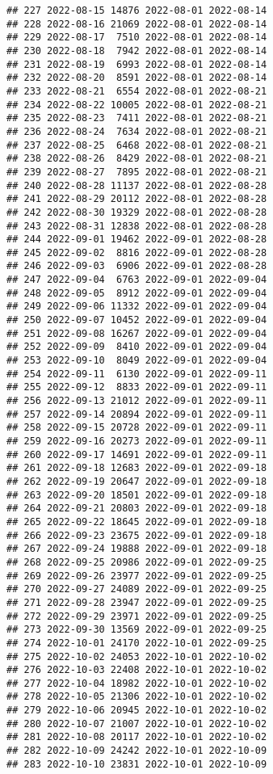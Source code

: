 \documentclass[
]{article}
\begin{document}
\begin{verbatim}
## 227 2022-08-15 14876 2022-08-01 2022-08-14
## 228 2022-08-16 21069 2022-08-01 2022-08-14
## 229 2022-08-17  7510 2022-08-01 2022-08-14
## 230 2022-08-18  7942 2022-08-01 2022-08-14
## 231 2022-08-19  6993 2022-08-01 2022-08-14
## 232 2022-08-20  8591 2022-08-01 2022-08-14
## 233 2022-08-21  6554 2022-08-01 2022-08-21
## 234 2022-08-22 10005 2022-08-01 2022-08-21
## 235 2022-08-23  7411 2022-08-01 2022-08-21
## 236 2022-08-24  7634 2022-08-01 2022-08-21
## 237 2022-08-25  6468 2022-08-01 2022-08-21
## 238 2022-08-26  8429 2022-08-01 2022-08-21
## 239 2022-08-27  7895 2022-08-01 2022-08-21
## 240 2022-08-28 11137 2022-08-01 2022-08-28
## 241 2022-08-29 20112 2022-08-01 2022-08-28
## 242 2022-08-30 19329 2022-08-01 2022-08-28
## 243 2022-08-31 12838 2022-08-01 2022-08-28
## 244 2022-09-01 19462 2022-09-01 2022-08-28
## 245 2022-09-02  8816 2022-09-01 2022-08-28
## 246 2022-09-03  6906 2022-09-01 2022-08-28
## 247 2022-09-04  6763 2022-09-01 2022-09-04
## 248 2022-09-05  8912 2022-09-01 2022-09-04
## 249 2022-09-06 11332 2022-09-01 2022-09-04
## 250 2022-09-07 10452 2022-09-01 2022-09-04
## 251 2022-09-08 16267 2022-09-01 2022-09-04
## 252 2022-09-09  8410 2022-09-01 2022-09-04
## 253 2022-09-10  8049 2022-09-01 2022-09-04
## 254 2022-09-11  6130 2022-09-01 2022-09-11
## 255 2022-09-12  8833 2022-09-01 2022-09-11
## 256 2022-09-13 21012 2022-09-01 2022-09-11
## 257 2022-09-14 20894 2022-09-01 2022-09-11
## 258 2022-09-15 20728 2022-09-01 2022-09-11
## 259 2022-09-16 20273 2022-09-01 2022-09-11
## 260 2022-09-17 14691 2022-09-01 2022-09-11
## 261 2022-09-18 12683 2022-09-01 2022-09-18
## 262 2022-09-19 20647 2022-09-01 2022-09-18
## 263 2022-09-20 18501 2022-09-01 2022-09-18
## 264 2022-09-21 20803 2022-09-01 2022-09-18
## 265 2022-09-22 18645 2022-09-01 2022-09-18
## 266 2022-09-23 23675 2022-09-01 2022-09-18
## 267 2022-09-24 19888 2022-09-01 2022-09-18
## 268 2022-09-25 20986 2022-09-01 2022-09-25
## 269 2022-09-26 23977 2022-09-01 2022-09-25
## 270 2022-09-27 24089 2022-09-01 2022-09-25
## 271 2022-09-28 23947 2022-09-01 2022-09-25
## 272 2022-09-29 23971 2022-09-01 2022-09-25
## 273 2022-09-30 13569 2022-09-01 2022-09-25
## 274 2022-10-01 24170 2022-10-01 2022-09-25
## 275 2022-10-02 24053 2022-10-01 2022-10-02
## 276 2022-10-03 22408 2022-10-01 2022-10-02
## 277 2022-10-04 18982 2022-10-01 2022-10-02
## 278 2022-10-05 21306 2022-10-01 2022-10-02
## 279 2022-10-06 20945 2022-10-01 2022-10-02
## 280 2022-10-07 21007 2022-10-01 2022-10-02
## 281 2022-10-08 20117 2022-10-01 2022-10-02
## 282 2022-10-09 24242 2022-10-01 2022-10-09
## 283 2022-10-10 23831 2022-10-01 2022-10-09

\end{verbatim}
\end{document}

